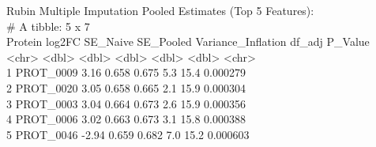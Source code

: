 \documentclass[11pt,oneside]{book}
\begin{document}
\begin{routput}
Rubin Multiple Imputation Pooled Estimates (Top 5 Features):\\
\# A tibble: 5 x 7\\
\hspace*{1em}Protein \hspace*{1.5em}log2FC SE\_Naive SE\_Pooled Variance\_Inflation df\_adj P\_Value\\
\hspace*{1em}\textless{}chr\textgreater{} \hspace*{1.5em}\textless{}dbl\textgreater{} \hspace*{1em}\textless{}dbl\textgreater{} \hspace*{1.5em}\textless{}dbl\textgreater{} \hspace*{4em}\textless{}dbl\textgreater{} \hspace*{1.5em}\textless{}dbl\textgreater{} \textless{}chr\textgreater{}\\
1 PROT\_0009 \hspace*{1.2em}3.16 \hspace*{1.5em}0.658 \hspace*{1.5em}0.675 \hspace*{5em}5.3 \hspace*{2em}15.4 0.000279\\
2 PROT\_0020 \hspace*{1.2em}3.05 \hspace*{1.5em}0.658 \hspace*{1.5em}0.665 \hspace*{5em}2.1 \hspace*{2em}15.9 0.000304\\
3 PROT\_0003 \hspace*{1.2em}3.04 \hspace*{1.5em}0.664 \hspace*{1.5em}0.673 \hspace*{5em}2.6 \hspace*{2em}15.9 0.000356\\
4 PROT\_0006 \hspace*{1.2em}3.02 \hspace*{1.5em}0.663 \hspace*{1.5em}0.673 \hspace*{5em}3.1 \hspace*{2em}15.8 0.000388\\
5 PROT\_0046 \hspace*{0.8em}-2.94 \hspace*{1.5em}0.659 \hspace*{1.5em}0.682 \hspace*{5em}7.0 \hspace*{2em}15.2 0.000603
\end{routput}
\end{document}
